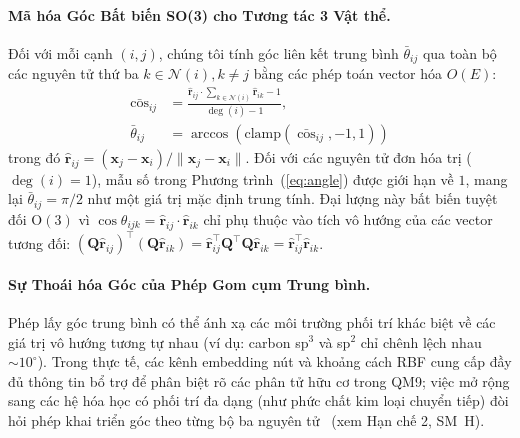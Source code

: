 \documentclass[10pt,twocolumn,letterpaper]{article}
\begin{document}
\paragraph{Mã hóa Góc Bất biến SO(3) cho Tương tác 3 Vật thể.}
Đối với mỗi cạnh $(i, j)$, chúng tôi tính góc liên kết trung bình $\bar{\theta}_{ij}$ qua toàn bộ các nguyên tử thứ ba $k \in \mathcal{N}(i), k \neq j$ bằng các phép toán vector hóa $O(E)$:
\begin{align}
    \bar{\cos}_{ij} &= \frac{\hat{\mathbf{r}}_{ij} \cdot \sum_{k \in \mathcal{N}(i)} \hat{\mathbf{r}}_{ik} - 1}{\deg(i) - 1}, \label{eq:angle} \\
    \bar{\theta}_{ij} &= \arccos\!\left(\mathrm{clamp}(\bar{\cos}_{ij}, -1, 1)\right) \nonumber
\end{align}
trong đó $\hat{\mathbf{r}}_{ij} = (\mathbf{x}_j - \mathbf{x}_i) / \|\mathbf{x}_j - \mathbf{x}_i\|$. Đối với các nguyên tử đơn hóa trị ($\deg(i) = 1$), mẫu số trong Phương trình~(\ref{eq:angle}) được giới hạn về $1$, mang lại $\bar{\theta}_{ij} = \pi/2$ như một giá trị mặc định trung tính. Đại lượng này bất biến tuyệt đối $\mathrm{O}(3)$ vì $\cos \theta_{ijk} = \hat{\mathbf{r}}_{ij} \cdot \hat{\mathbf{r}}_{ik}$ chỉ phụ thuộc vào tích vô hướng của các vector tương đối: $(\mathbf{Q}\hat{\mathbf{r}}_{ij})^\top (\mathbf{Q}\hat{\mathbf{r}}_{ik}) = \hat{\mathbf{r}}_{ij}^\top \mathbf{Q}^\top \mathbf{Q} \hat{\mathbf{r}}_{ik} = \hat{\mathbf{r}}_{ij}^\top \hat{\mathbf{r}}_{ik}$.

\paragraph{Sự Thoái hóa Góc của Phép Gom cụm Trung bình.}
Phép lấy góc trung bình có thể ánh xạ các môi trường phối trí khác biệt về các giá trị vô hướng tương tự nhau (ví dụ: carbon sp$^3$ và sp$^2$ chỉ chênh lệch nhau $\sim 10^\circ$). Trong thực tế, các kênh embedding nút và khoảng cách RBF cung cấp đầy đủ thông tin bổ trợ để phân biệt rõ các phân tử hữu cơ trong QM9; việc mở rộng sang các hệ hóa học có phối trí đa dạng (như phức chất kim loại chuyển tiếp) đòi hỏi phép khai triển góc theo từng bộ ba nguyên tử~\cite{klicperaFastUncertaintyAwareDirectional2020, klicperaGemNetUniversalDirectional2021} (xem Hạn chế 2, SM~H).
\end{document}
